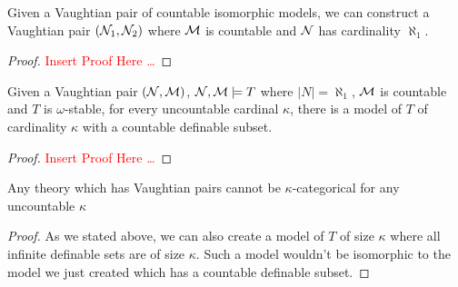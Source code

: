 \begin{theorem}\label{theorem_aleph_one_vaightian_pairs}
Given a Vaughtian pair of countable isomorphic models, we can construct a Vaughtian pair \((\mathcal{N}_1, \mathcal{N}_2)\) where \(\mathcal{M}\) is countable and \(\mathcal{N}\) has cardinality \(\aleph_1\). %
\end{theorem}

\begin{proof}
\textcolor{red}{Insert Proof Here \ldots} 
\end{proof}

\begin{theorem}\label{theorem_uncountable_vaightian_pairs}
Given a Vaughtian pair \((\mathcal{N}, \mathcal{M})\), \(\mathcal{N}, \mathcal{M} \models T\) where \(|N| = \aleph_1\), \(\mathcal{M}\) is countable and \(T\) is \(\omega\)-stable, for every uncountable cardinal \(\kappa\), there is a model of \(T\) of cardinality \(\kappa\) with a countable definable subset.  
\end{theorem}

\begin{proof}
\textcolor{red}{Insert Proof Here \ldots} 
\end{proof}

\begin{theorem}\label{theorem_vaughtian_pairs_categoricity}
Any theory which has Vaughtian pairs cannot be \(\kappa\)-categorical for any uncountable \(\kappa\)
\end{theorem}

\begin{proof}
As we stated above, we can also create a model of \(T\) of size \(\kappa\) where all infinite definable sets are of size \(\kappa\). 
Such a model wouldn't be isomorphic to the model we just created which has a countable definable subset. 
\end{proof}
